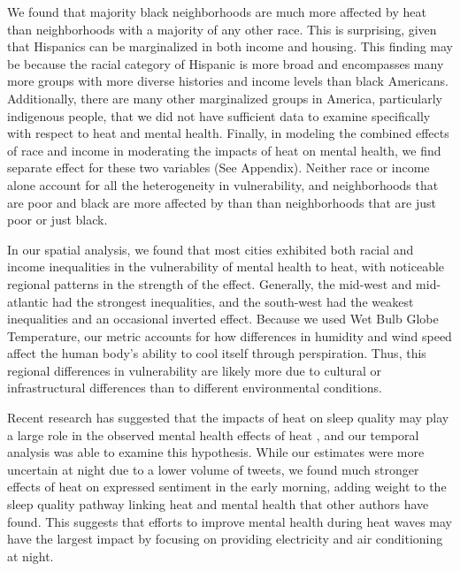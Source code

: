 \documentclass{article}
\begin{document}
We found that majority black neighborhoods are much more affected by heat than neighborhoods with a majority of any other race.  This is surprising, given that Hispanics can be marginalized in both income and housing.  This finding may be because the racial category of Hispanic is more broad and encompasses many more groups with more diverse histories and income levels than black Americans.  Additionally, there are many other marginalized groups in America, particularly indigenous people, that we did not have sufficient data to examine specifically with respect to heat and mental health.  Finally, in modeling the combined effects of race and income in moderating the impacts of heat on mental health, we find separate effect for these two variables (See Appendix).  Neither race or income alone account for all the heterogeneity in vulnerability, and neighborhoods that are poor and black are more affected by than than neighborhoods that are just poor or just black.

In our spatial analysis, we found that most cities exhibited both racial and income inequalities in the vulnerability of mental health to heat, with noticeable regional patterns in the strength of the effect.  Generally, the mid-west and mid-atlantic had the strongest inequalities, and the south-west had the weakest inequalities and an occasional inverted effect.  Because we used Wet Bulb Globe Temperature, our metric accounts for how differences in humidity and wind speed affect the human body's ability to cool itself through perspiration.  Thus, this regional differences in vulnerability are likely more due to cultural or infrastructural differences than to different environmental conditions.

Recent research has suggested that the impacts of heat on sleep quality may play a large role in the observed mental health effects of heat \cite{Obradovich2017May, Mullins2019Dec}, and our temporal analysis was able to examine this hypothesis.  While our estimates were more uncertain at night due to a lower volume of tweets, we found much stronger effects of heat on expressed sentiment in the early morning, adding weight to the sleep quality pathway linking heat and mental health that other authors have found.  This suggests that efforts to improve mental health during heat waves may have the largest impact by focusing on providing electricity and air conditioning at night.
\end{document}
